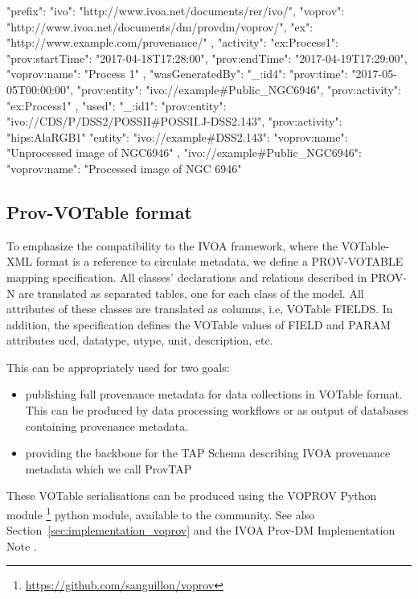 
\begin{verbnobox}[\scriptsize]
{
  "prefix": {
    "ivo": "http://www.ivoa.net/documents/rer/ivo/",
    "voprov": "http://www.ivoa.net/documents/dm/provdm/voprov/",
    "ex": "http://www.example.com/provenance/"
  },
  "activity": {
    "ex:Process1": {
      "prov:startTime": "2017-04-18T17:28:00",
      "prov:endTime": "2017-04-19T17:29:00",
      "voprov:name": "Process 1"
    }
  },
  "wasGeneratedBy": {
    "_:id4": {
      "prov:time": "2017-05-05T00:00:00",
      "prov:entity": "ivo://example#Public_NGC6946",
      "prov:activity": "ex:Process1"
    }
  },
  "used": {
    "_:id1": {
      "prov:entity": "ivo://CDS/P/DSS2/POSSII#POSSII.J-DSS2.143",
      "prov:activity": "hips:AlaRGB1"
    }
  }
  "entity": {
    "ivo://example#DSS2.143": {
      "voprov:name": "Unprocessed image of NGC6946"
    },
    "ivo://example#Public_NGC6946": {
      "voprov:name": "Processed image of NGC 6946"
    }
  }
}
\end{verbnobox}
\subsection{Prov-VOTable format} 
To emphasize the compatibility to the IVOA framework, where the VOTable-XML format is a reference to circulate metadata, we define a PROV-VOTABLE mapping specification. All classes' declarations and relations described in PROV-N are translated as separated tables, one for each class of the model.
All attributes of these classes are translated as columns, i.e, VOTable FIELDS. 
In addition, the specification defines the VOTable values of FIELD and PARAM attributes ucd, datatype, utype, unit, description, etc. 

This can be appropriately used for two goals:
\begin{itemize}
	\item publishing full provenance metadata for data collections in VOTable format. This can be produced by data processing workflows or as output of databases containing provenance metadata.
	\item providing the backbone for the TAP Schema describing IVOA provenance metadata which we call ProvTAP 
\end{itemize}

These VOTable serialisations can be produced  using  the VOPROV Python module \footnote{\url{https://github.com/sanguillon/voprov}} python module, available to the community. See also Section~\ref{sec:implementation_voprov} and the IVOA Prov-DM Implementation Note \citep[]{std:ProvenanceImplementationNote}. 

